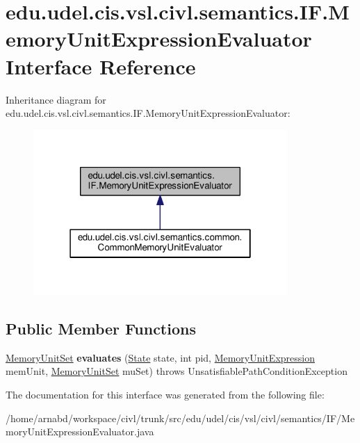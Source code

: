 \hypertarget{interfaceedu_1_1udel_1_1cis_1_1vsl_1_1civl_1_1semantics_1_1IF_1_1MemoryUnitExpressionEvaluator}{}\section{edu.\+udel.\+cis.\+vsl.\+civl.\+semantics.\+I\+F.\+Memory\+Unit\+Expression\+Evaluator Interface Reference}
\label{interfaceedu_1_1udel_1_1cis_1_1vsl_1_1civl_1_1semantics_1_1IF_1_1MemoryUnitExpressionEvaluator}


Inheritance diagram for edu.\+udel.\+cis.\+vsl.\+civl.\+semantics.\+I\+F.\+Memory\+Unit\+Expression\+Evaluator\+:
\nopagebreak
\begin{figure}[H]
\begin{center}
\leavevmode
\includegraphics[width=274pt]{interfaceedu_1_1udel_1_1cis_1_1vsl_1_1civl_1_1semantics_1_1IF_1_1MemoryUnitExpressionEvaluator__inherit__graph}
\end{center}
\end{figure}
\subsection*{Public Member Functions}
\begin{DoxyCompactItemize}
\item 
\hypertarget{interfaceedu_1_1udel_1_1cis_1_1vsl_1_1civl_1_1semantics_1_1IF_1_1MemoryUnitExpressionEvaluator_afbfdce673341b12ea1e871970653cf08}{}\hyperlink{interfaceedu_1_1udel_1_1cis_1_1vsl_1_1civl_1_1state_1_1IF_1_1MemoryUnitSet}{Memory\+Unit\+Set} {\bfseries evaluates} (\hyperlink{interfaceedu_1_1udel_1_1cis_1_1vsl_1_1civl_1_1state_1_1IF_1_1State}{State} state, int pid, \hyperlink{interfaceedu_1_1udel_1_1cis_1_1vsl_1_1civl_1_1model_1_1IF_1_1expression_1_1MemoryUnitExpression}{Memory\+Unit\+Expression} mem\+Unit, \hyperlink{interfaceedu_1_1udel_1_1cis_1_1vsl_1_1civl_1_1state_1_1IF_1_1MemoryUnitSet}{Memory\+Unit\+Set} mu\+Set)  throws Unsatisfiable\+Path\+Condition\+Exception\label{interfaceedu_1_1udel_1_1cis_1_1vsl_1_1civl_1_1semantics_1_1IF_1_1MemoryUnitExpressionEvaluator_afbfdce673341b12ea1e871970653cf08}

\end{DoxyCompactItemize}


The documentation for this interface was generated from the following file\+:\begin{DoxyCompactItemize}
\item 
/home/arnabd/workspace/civl/trunk/src/edu/udel/cis/vsl/civl/semantics/\+I\+F/Memory\+Unit\+Expression\+Evaluator.\+java\end{DoxyCompactItemize}

